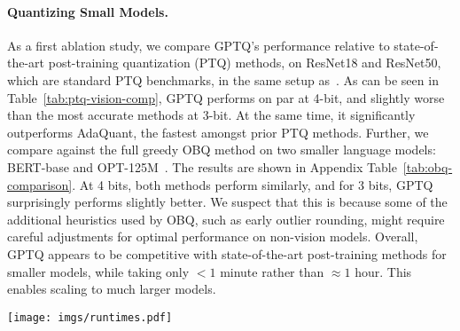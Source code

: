 \paragraph{Quantizing Small Models.} As a first ablation study, we compare GPTQ's performance relative to state-of-the-art post-training quantization (PTQ) methods, on ResNet18 and ResNet50, which are standard PTQ benchmarks, in the same setup as~\cite{frantar2022obc}. 
As can be seen in Table~\ref{tab:ptq-vision-comp}, GPTQ performs on par at 4-bit, and slightly worse than the most accurate methods at 3-bit. At the same time, it significantly outperforms AdaQuant, the fastest amongst prior PTQ methods. 
Further, we compare against the full greedy OBQ method on two smaller language models: BERT-base \cite{devlin2018bert} and OPT-125M~\cite{zhang2022opt}. 
The results are shown in Appendix Table~\ref{tab:obq-comparison}. 
At 4 bits, both methods perform similarly, and for 3 bits, GPTQ surprisingly performs slightly better. 
We suspect that this is because some of the additional heuristics used by OBQ, such as early outlier rounding, might require careful adjustments for optimal performance on non-vision models. 
Overall, GPTQ appears to be competitive with state-of-the-art post-training methods for smaller models, while taking only $< 1$ minute rather than $\approx 1$ hour. 
This enables scaling to much larger models.

\begin{table}[h]
\begin{minipage}[t]{.45\textwidth}
    \centering
    \vspace{0pt}
    \vspace{5pt}
    \caption{Comparison with state-of-the-art post-training methods for vision models.}
    \label{tab:ptq-vision-comp}
\end{minipage}
\hfill
\begin{minipage}[t]{.45\textwidth}
    \centering
    \vspace{-2pt}
    \texttt{[image: imgs/runtimes.pdf]}    
    \label{fig:runtimes}
\end{minipage}
\end{table}
\vspace{-15pt}

